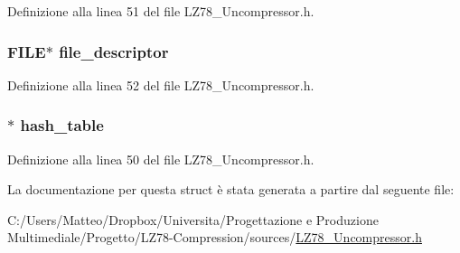 Definizione alla linea 51 del file L\-Z78\-\_\-\-Uncompressor.\-h.

\hypertarget{struct__lz78__uncompressor__t_a52a785c913c28c61f56c4aa10e3a1641}{
\subsubsection[{file\-\_\-descriptor}]{\setlength{\rightskip}{0pt plus 5cm}F\-I\-L\-E$\ast$ file\-\_\-descriptor}}\label{struct__lz78__uncompressor__t_a52a785c913c28c61f56c4aa10e3a1641}


Definizione alla linea 52 del file L\-Z78\-\_\-\-Uncompressor.\-h.

\hypertarget{struct__lz78__uncompressor__t_abac9341b52ba2c7b76f924845486179f}{
\subsubsection[{hash\-\_\-table}]{$\ast$ hash\-\_\-table}}\label{struct__lz78__uncompressor__t_abac9341b52ba2c7b76f924845486179f}


Definizione alla linea 50 del file L\-Z78\-\_\-\-Uncompressor.\-h.



La documentazione per questa struct è stata generata a partire dal seguente file\-:\begin{DoxyCompactItemize}
\item 
C\-:/\-Users/\-Matteo/\-Dropbox/\-Universita/\-Progettazione e Produzione Multimediale/\-Progetto/\-L\-Z78-\/\-Compression/sources/\hyperlink{_l_z78___uncompressor_8h}{L\-Z78\-\_\-\-Uncompressor.\-h}\end{DoxyCompactItemize}
